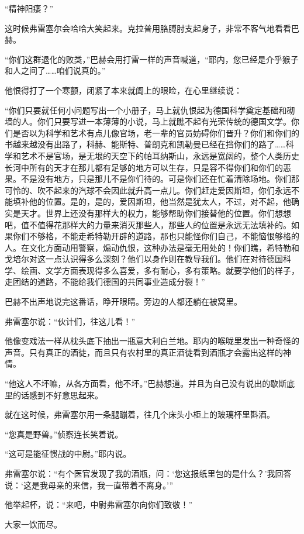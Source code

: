 “精神阳痿？”

这时候弗雷塞尔会哈哈大笑起来。克拉普用胳膊肘支起身子，非常不客气地看看巴赫。

“你们这群退化的败类，”巴赫会用打雷一样的声音喊道，“耶内，您已经是介乎猴子和人之间了……咱们说真的。”

他恨得打了一个寒颤，闭紧了本来就阖上的眼睑，在心里继续说：

“你们只要就任何小问题写出一个小册子，马上就仇恨起为德国科学奠定基础和砌墙的人。你们只要写进一本薄薄的小说，马上就瞧不起有光荣传统的德国文学。你们是否以为科学和艺术有点儿像官场，老一辈的官员妨碍你们晋升？你们和你们的书越来越没有出路了，科赫、能斯特、普朗克和凯勒曼已经在挡你们的路了……科学和艺术不是官场，是无垠的天空下的帕耳纳斯山，永远是宽阔的，整个人类历史长河中所有的天才在那儿都有足够的地方可以生存，只是容不得你们和你们的恶果。不是没有地方，只是那儿不是你们待的。可是你们还在忙着清除场地。你们那可怜的、吹不起来的汽球不会因此就升高一点儿。你们赶走爱因斯坦，你们永远不能填补他的位置。是的，是的，爱因斯坦，他当然是犹太人，不过，对不起，他确实是天才。世界上还没有那样大的权力，能够帮助你们接替他的位置。你们想想吧，值不值得花那样大的力量来消灭那些人，那些人的位置是永远无法填补的。如果你们不够格，不能走希特勒开辟的道路，那也只能怪你们自己，不能恼恨够格的人。在文化方面动用警察，煽动仇恨，这种办法是毫无用处的！你们瞧，希特勒和戈培尔对这一点认识得多么深刻？他们以身作则在教导我们。他们在对待德国科学、绘画、文学方面表现得多么喜爱，多有耐心，多有策略。就要学他们的样子，走团结的道路，不能给我们德国的共同事业造成分裂！”

巴赫不出声地说完这番话，睁开眼睛。旁边的人都还躺在被窝里。

弗雷塞尔说：“伙计们，往这儿看！”

他像变戏法一样从枕头底下抽出一瓶意大利白兰地。耶内的喉咙里发出一种奇怪的声音。只有真正的酒徒，而且只有农村里的真正酒徒看到酒瓶才会露出这样的神情。

“他这人不坏嘛，从各方面看，他不坏。”巴赫想道。并且为自己没有说出的歇斯底里的话感到不好意思起来。

就在这时候，弗雷塞尔用一条腿蹦着，往几个床头小柜上的玻璃杯里斟酒。

“您真是野兽。”侦察连长笑着说。

“这可是能征惯战的中尉。”耶内说。

弗雷塞尔说：“有个医官发现了我的酒瓶，问：‘您这报纸里包的是什么？’我回答说：‘这是我母亲的来信，我一直带着不离身。’”

他举起杯，说：“来吧，中尉弗雷塞尔向你们致敬！”

大家一饮而尽。

